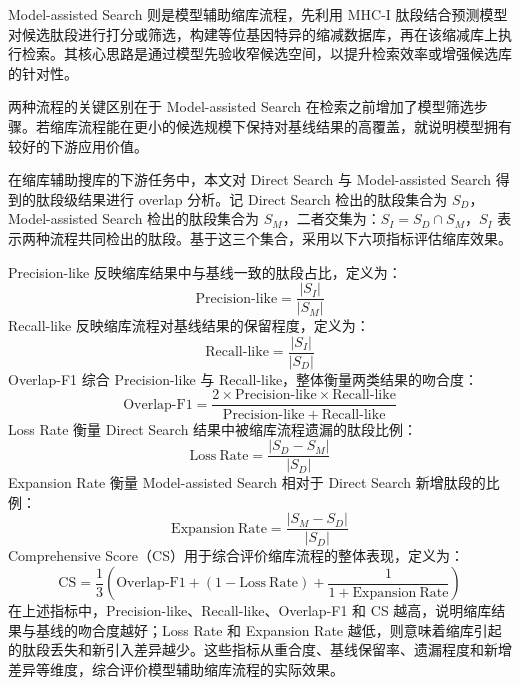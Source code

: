 Model-assisted Search 则是模型辅助缩库流程，先利用 MHC-I 肽段结合预测模型对候选肽段进行打分或筛选，构建等位基因特异的缩减数据库，再在该缩减库上执行检索。其核心思路是通过模型先验收窄候选空间，以提升检索效率或增强候选库的针对性。

两种流程的关键区别在于 Model-assisted Search 在检索之前增加了模型筛选步骤。若缩库流程能在更小的候选规模下保持对基线结果的高覆盖，就说明模型拥有较好的下游应用价值。

在缩库辅助搜库的下游任务中，本文对 Direct Search 与 Model-assisted Search 得到的肽段级结果进行 overlap 分析。记 Direct Search 检出的肽段集合为 $S_D$，Model-assisted Search 检出的肽段集合为 $S_M$，二者交集为：$S_I = S_D \cap S_M$，$S_I$ 表示两种流程共同检出的肽段。基于这三个集合，采用以下六项指标评估缩库效果。

Precision-like 反映缩库结果中与基线一致的肽段占比，定义为：
\begin{equation}
\mathrm{Precision}\mbox{-}\mathrm{like}
=
\frac{|S_I|}{|S_M|}
\end{equation}
Recall-like 反映缩库流程对基线结果的保留程度，定义为：
\begin{equation}
\mathrm{Recall}\mbox{-}\mathrm{like}
=
\frac{|S_I|}{|S_D|}
\end{equation}
Overlap-F1 综合 Precision-like 与 Recall-like，整体衡量两类结果的吻合度：
\begin{equation}
\mathrm{Overlap}\mbox{-}\mathrm{F1}
=
\frac{
2 \times
\mathrm{Precision}\mbox{-}\mathrm{like}
\times
\mathrm{Recall}\mbox{-}\mathrm{like}
}{
\mathrm{Precision}\mbox{-}\mathrm{like}
+
\mathrm{Recall}\mbox{-}\mathrm{like}
}
\end{equation}
Loss Rate 衡量 Direct Search 结果中被缩库流程遗漏的肽段比例：
\begin{equation}
\mathrm{Loss}\ \mathrm{Rate}
    =
    \frac{\left|S_D - S_M\right|}{\left|S_D\right|}
\end{equation}
Expansion Rate 衡量 Model-assisted Search 相对于 Direct Search 新增肽段的比例：
\begin{equation}
\mathrm{Expansion}\ \mathrm{Rate}
    =
    \frac{\left|S_M - S_D\right|}{\left|S_D\right|}
\end{equation}
Comprehensive Score（CS）用于综合评价缩库流程的整体表现，定义为：
\begin{equation}
\mathrm{CS}
    =
\frac{1}{3}
\left(
\mathrm{Overlap}\mbox{-}\mathrm{F1}
+
\left(1-\mathrm{Loss}\ \mathrm{Rate}\right)
+
\frac{1}{1+\mathrm{Expansion}\ \mathrm{Rate}}
    \right)
\end{equation}
在上述指标中，Precision-like、Recall-like、Overlap-F1 和 CS 越高，说明缩库结果与基线的吻合度越好；Loss Rate 和 Expansion Rate 越低，则意味着缩库引起的肽段丢失和新引入差异越少。这些指标从重合度、基线保留率、遗漏程度和新增差异等维度，综合评价模型辅助缩库流程的实际效果。

